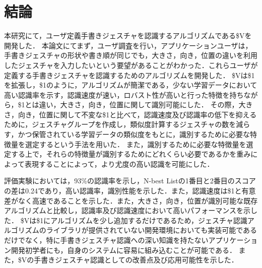 \chapter{結論}
本研究にて，ユーザ定義手書きジェスチャを認識するアルゴリズムである\$Vを開発した．
本論文にてまず，ユーザ調査を行い，アプリケーションユーザは，手書きジェスチャの形状や書き順が同じでも，大きさ，向き，位置の違いを利用したジェスチャを入力したいという要望があることがわかった．これらユーザが定義する手書きジェスチャを認識するためのアルゴリズムを開発した．
\$Vは\$1を拡張し，\$1のように，アルゴリズムが簡潔である，少ない学習データにおいて高い認識率を示す，認識速度が速い，ロバスト性が高いと行った特徴を持ちながら，\$1とは違い，大きさ，向き，位置に関して識別可能にした．
その際，大きさ，向き，位置に関して不変な\$1と比べて，認識速度及び認識率の低下を抑えるために，ジェスチャグループを作成し，類似度計算するジェスチャの数を減らす，かつ保管されている学習データの類似度をもとに，識別するために必要な特徴量を選定するという手法を用いた．
また，識別するために必要な特徴量を選定する上で，それらの特徴量が識別するためにどれくらい必要であるかを重みによって表現することによって，より尤度の高い認識を可能にした．

評価実験においては，93\%の認識率を示し，N-best Listの1番目と2番目のスコアの差は0.24であり，高い認識率，識別性能を示した．また，認識速度は\$1と有意差がなく高速であることを示した．また，大きさ，向き，位置が識別可能な既存アルゴリズムと比較し，認識率及び認識速度において高いパフォーマンスを示した．
\$Vは\$1にアルゴリズムを少し追加するだけであるため，ジェスチャ認識アルゴリズムのライブラリが提供されていない開発環境においても実装可能であるだけでなく，特に手書きジェスチャ認識への深い知識を持たないアプリケーション開発初学者にも，自身のシステムに容易に組み込むことが可能である．
また，\$Vの手書きジェスチャ認識としての改善点及び応用可能性を示した．